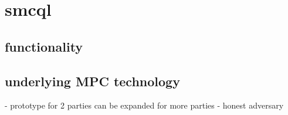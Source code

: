 \section{smcql}

\subsection{functionality}

\subsection{underlying MPC technology}





- prototype for 2 parties can be expanded for more parties
- honest adversary